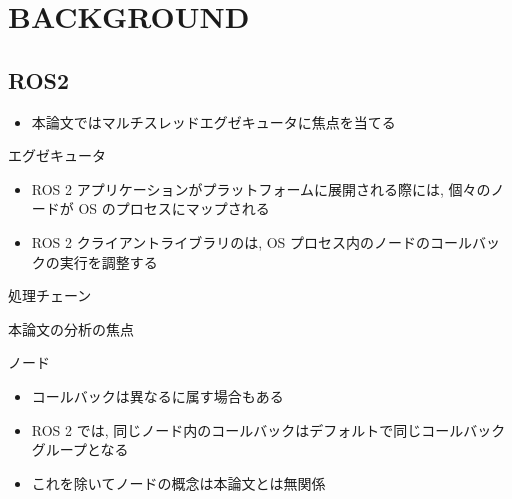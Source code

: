 

\section{BACKGROUND}
\label{sec: background}


\subsection{ROS2}
\label{ssec: ros2}

\begin{frame}{}
    \begin{itemize}
        \item 本論文ではマルチスレッドエグゼキュータに焦点を当てる
    \end{itemize}
\end{frame}


\begin{frame}{エグゼキュータ}
    \begin{itemize}
        \item ROS 2 アプリケーションがプラットフォームに展開される際には, 個々のノードが OS のプロセスにマップされる
        \item ROS 2 クライアントライブラリのは, OS プロセス内のノードのコールバックの実行を調整する
    \end{itemize}
\end{frame}


\begin{frame}{処理チェーン}
\end{frame}


\begin{frame}{本論文の分析の焦点}
\end{frame}


\begin{frame}{ノード}
    \begin{itemize}
        \item コールバックは異なるに属す場合もある
        \item ROS 2 では, 同じノード内のコールバックはデフォルトで同じコールバックグループとなる
        \item これを除いてノードの概念は本論文とは無関係
    \end{itemize}

\end{frame}


